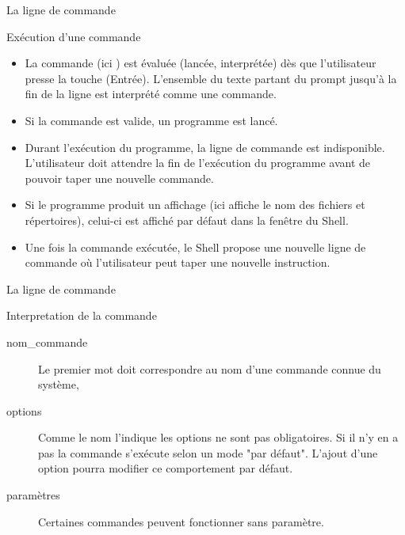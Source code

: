 \begin{frame}{La ligne de commande}
  \begin{center}
  \end{center}
  \begin{block}{Exécution d'une commande}
    \begin{itemize}
    \item La commande (ici ) est évaluée (lancée, interprétée)
      dès que l'utilisateur presse la touche \Return
      (Entrée). L'ensemble du texte partant du prompt jusqu'à la fin de
      la ligne est interprété comme une commande.
    \item Si la commande est valide, un programme est lancé.
    \item Durant l'exécution du programme, la ligne de commande est
      indisponible. L'utilisateur doit attendre la fin de l'exécution du
      programme avant de pouvoir taper une nouvelle commande.
    \item Si le programme produit un affichage (ici  affiche le
      nom des fichiers et répertoires), celui-ci est affiché par défaut
      dans la fenêtre du Shell.
    \item Une fois la commande exécutée, le Shell propose une nouvelle
      ligne de commande où l'utilisateur peut taper une nouvelle
      instruction.
    \end{itemize}
  \end{block}
\end{frame}
\begin{frame}{La ligne de commande}
  \begin{center}
  \end{center}
  \begin{block}{Interpretation de la commande}
    \begin{description}
    \item[nom\_commande] Le premier mot doit correspondre au nom d'une
      commande connue du système,
    \item[options] Comme le nom l'indique les options ne sont pas
      obligatoires. Si il n'y en a pas la commande s'exécute selon un
      mode "par défaut". L'ajout d'une option pourra modifier ce
      comportement par défaut.
    \item[paramètres] Certaines commandes peuvent fonctionner sans
      paramètre.
    \end{description}
  \end{block}
\end{frame}

